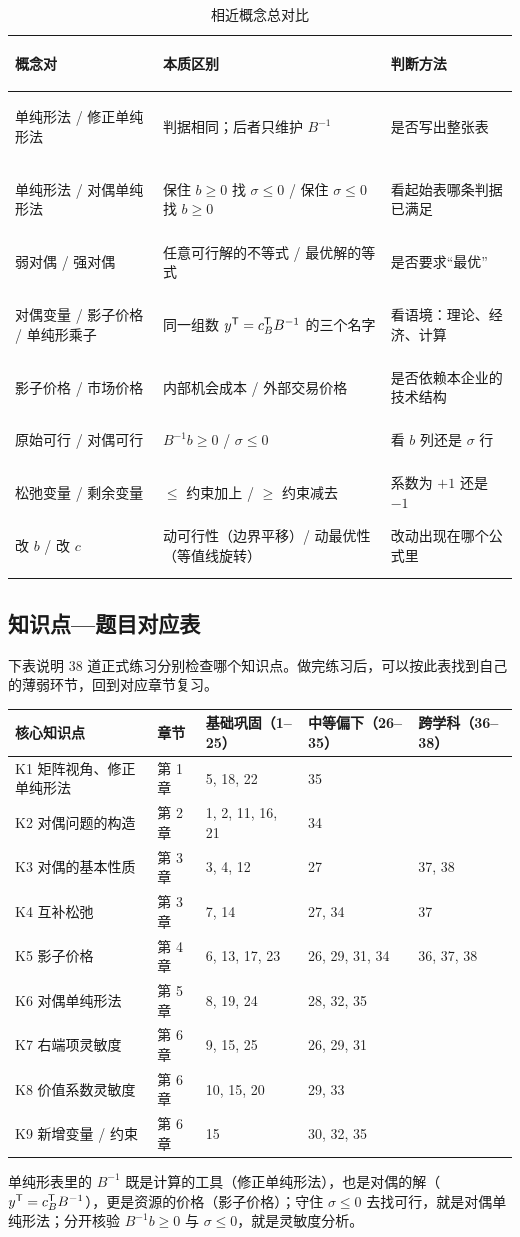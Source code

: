 {\small
\begin{xltabular}{\linewidth}{@{}>{\bfseries\raggedright\arraybackslash}p{3.4cm}>{\raggedright\arraybackslash}X>{\raggedright\arraybackslash}X@{}}
\toprule
{}概念对 & 本质区别 & 判断方法\\\midrule
单纯形法 / 修正单纯形法 & 判据相同；后者只维护 $B^{-1}$ & 是否写出整张表\\
单纯形法 / 对偶单纯形法 & 保住 $b\ge0$ 找 $\sigma\le0$ / 保住 $\sigma\le0$ 找 $b\ge0$ & 看起始表哪条判据已满足\\
弱对偶 / 强对偶 & 任意可行解的不等式 / 最优解的等式 & 是否要求“最优”\\
对偶变量 / 影子价格 / 单纯形乘子 & 同一组数 $y^{\mathsf T}=c_B^{\mathsf T} B^{-1}$ 的三个名字 & 看语境：理论、经济、计算\\
影子价格 / 市场价格 & 内部机会成本 / 外部交易价格 & 是否依赖本企业的技术结构\\
原始可行 / 对偶可行 & $B^{-1}b\ge0$ / $\sigma\le0$ & 看 $b$ 列还是 $\sigma$ 行\\
松弛变量 / 剩余变量 & $\le$ 约束加上 / $\ge$ 约束减去 & 系数为 $+1$ 还是 $-1$\\
改 $b$ / 改 $c$ & 动可行性（边界平移）/ 动最优性（等值线旋转） & 改动出现在哪个公式里\\\bottomrule
\caption{相近概念总对比}\\
\end{xltabular}}


\subsection{知识点—题目对应表}

下表说明 38 道正式练习分别检查哪个知识点。做完练习后，可以按此表找到自己的薄弱环节，回到对应章节复习。

\begin{table}[!htbp]\centering
\small
\begin{tabular}{@{}lllll@{}}
\toprule
\rowcolor{lightblue}核心知识点 & 章节 & 基础巩固（1--25） & 中等偏下（26--35） & 跨学科（36--38）\\\midrule
K1 矩阵视角、修正单纯形法 & 第 1 章 & 5, 18, 22 & 35 & \\
K2 对偶问题的构造 & 第 2 章 & 1, 2, 11, 16, 21 & 34 & \\
K3 对偶的基本性质 & 第 3 章 & 3, 4, 12 & 27 & 37, 38\\
K4 互补松弛 & 第 3 章 & 7, 14 & 27, 34 & 37\\
K5 影子价格 & 第 4 章 & 6, 13, 17, 23 & 26, 29, 31, 34 & 36, 37, 38\\
K6 对偶单纯形法 & 第 5 章 & 8, 19, 24 & 28, 32, 35 & \\
K7 右端项灵敏度 & 第 6 章 & 9, 15, 25 & 26, 29, 31 & \\
K8 价值系数灵敏度 & 第 6 章 & 10, 15, 20 & 29, 33 & \\
K9 新增变量 / 约束 & 第 6 章 & 15 & 30, 32, 35 & \\\bottomrule
\end{tabular}\par\nopagebreak[4]
\label{tab:cover}
\end{table}

\begin{summarybox}[全篇一句话]
单纯形表里的 $B^{-1}$ 既是计算的工具（修正单纯形法），也是对偶的解（$y^{\mathsf T}=c_B^{\mathsf T} B^{-1}$），更是资源的价格（影子价格）；守住 $\sigma\le0$ 去找可行，就是对偶单纯形法；分开核验 $B^{-1}b\ge0$ 与 $\sigma\le0$，就是灵敏度分析。
\end{summarybox}
